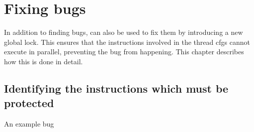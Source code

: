 \chapter{Fixing bugs}
\label{sect:fix_global_lock}

\newcommand{\one}{~\hspace{-1.2pt}1\hspace{3.0pt}~}

In addition to finding bugs, {\technique} can also be used to fix them
by introducing a new global lock.  This ensures that the instructions
involved in the thread \glspl{cfg} cannot execute in parallel,
preventing the bug from happening.  This chapter describes how this is
done in detail.

\section{Identifying the instructions which must be protected}
\label{sect:fix:identify}

\begin{sanefig}
  \hspace{-5mm}
  \hspace{-10mm}
  \caption{An example bug}
  \label{fig:fix_bug:complex_local}
\end{sanefig}

